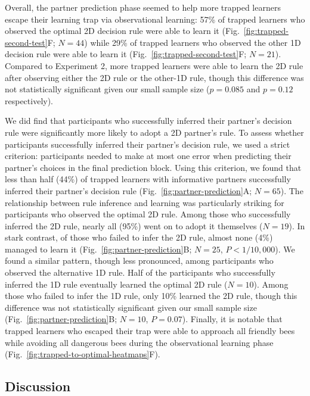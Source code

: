 \documentclass[11pt]{article} %
\begin{document}
Overall, the partner prediction phase seemed to help more trapped learners escape their learning trap via observational learning: 57\% of trapped learners who observed the optimal 2D decision rule were able to learn it (Fig.~\ref{fig:trapped-second-test}F; $N=44$) while 29\% of trapped learners who observed the other 1D decision rule were able to learn it (Fig.~\ref{fig:trapped-second-test}F; $N=21$). Compared to Experiment 2, more trapped learners were able to learn the 2D rule after observing either the 2D rule or the other-1D rule, though this difference was not statistically significant given our small sample size ($p=0.085$ and $p=0.12$ respectively).

We did find that participants who successfully inferred their partner's decision rule were significantly more likely to adopt a 2D partner's rule. To assess whether participants successfully inferred their partner's decision rule, we used a strict criterion: participants needed to make at most one error when predicting their partner's choices in the final prediction block. Using this criterion, we found that less than half (44\%) of trapped learners with informative partners successfully inferred their partner's decision rule (Fig.~\ref{fig:partner-prediction}A; $N=65$). The relationship between rule inference and learning was particularly striking for participants who observed the optimal 2D rule. Among those who successfully inferred the 2D rule, nearly all (95\%) went on to adopt it themselves ($N=19$). In stark contrast, of those who failed to infer the 2D rule, almost none (4\%) managed to learn it (Fig.~\ref{fig:partner-prediction}B; $N=25$, $P<1/10,000$). We found a similar pattern, though less pronounced, among participants who observed the alternative 1D rule. Half of the participants who successfully inferred the 1D rule eventually learned the optimal 2D rule ($N=10$). Among those who failed to infer the 1D rule, only 10\% learned the 2D rule, though this difference was not statistically significant given our small sample size (Fig.~\ref{fig:partner-prediction}B; $N=10$, $P=0.07$). Finally, it is notable that trapped learners who escaped their trap were able to approach all friendly bees while avoiding all dangerous bees during the observational learning phase (Fig.~\ref{fig:trapped-to-optimal-heatmaps}F).

\subsection{Discussion}
\end{document}
